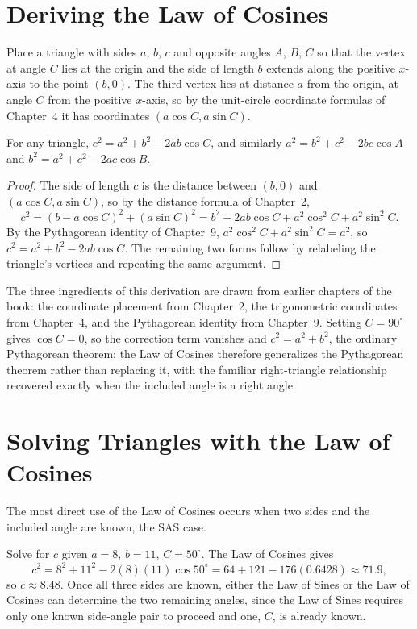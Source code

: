 \section{Deriving the Law of Cosines}

Place a triangle with sides $a$, $b$, $c$ and opposite angles $A$, $B$,
$C$ so that the vertex at angle $C$ lies at the origin and the side of
length $b$ extends along the positive $x$-axis to the point $(b,0)$. The
third vertex lies at distance $a$ from the origin, at angle $C$ from the
positive $x$-axis, so by the unit-circle coordinate formulas of Chapter~4
it has coordinates $(a\cos C, a\sin C)$.

\begin{theorem}
For any triangle, $c^2 = a^2 + b^2 - 2ab\cos C$, and similarly $a^2 = b^2
+ c^2 - 2bc\cos A$ and $b^2 = a^2 + c^2 - 2ac\cos B$.
\end{theorem}

\begin{proof}
The side of length $c$ is the distance between $(b,0)$ and $(a\cos C,
a\sin C)$, so by the distance formula of Chapter~2,
\[
c^2 = (b - a\cos C)^2 + (a\sin C)^2 = b^2 - 2ab\cos C + a^2\cos^2 C +
a^2\sin^2 C.
\]
By the Pythagorean identity of Chapter~9, $a^2\cos^2 C + a^2\sin^2 C =
a^2$, so $c^2 = a^2 + b^2 - 2ab\cos C$. The remaining two forms follow by
relabeling the triangle's vertices and repeating the same argument.
\end{proof}

The three ingredients of this derivation are drawn from earlier chapters
of the book: the coordinate placement from Chapter~2, the trigonometric
coordinates from Chapter~4, and the Pythagorean identity from Chapter~9.
Setting $C = 90^\circ$ gives $\cos C = 0$, so the correction term vanishes
and $c^2 = a^2 + b^2$, the ordinary Pythagorean theorem; the Law of
Cosines therefore generalizes the Pythagorean theorem rather than
replacing it, with the familiar right-triangle relationship recovered
exactly when the included angle is a right angle.

\section{Solving Triangles with the Law of Cosines}

The most direct use of the Law of Cosines occurs when two sides and the
included angle are known, the SAS case.

\begin{example}
Solve for $c$ given $a = 8$, $b = 11$, $C = 50^\circ$. The Law of Cosines
gives
\[
c^2 = 8^2 + 11^2 - 2(8)(11)\cos50^\circ = 64 + 121 - 176(0.6428) \approx
71.9,
\]
so $c \approx 8.48$. Once all three sides are known, either the Law of
Sines or the Law of Cosines can determine the two remaining angles, since
the Law of Sines requires only one known side-angle pair to proceed and
one, $C$, is already known.
\end{example}

